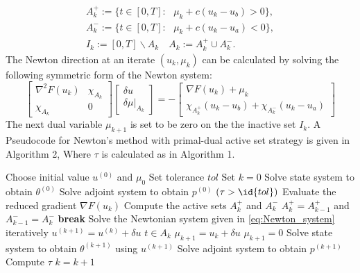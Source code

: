 \begin{align}
    \label{eq:active_inactive}
    A_k^{+} := \{ t \in [0,T]: \text{ } \mu_k + c(u_k - u_b) >0 \}, \\
    A_k^{-} := \{ t \in [0,T]: \text{ } \mu_k + c(u_k - u_a) <0 \}, \\
    I_k := [0,T] \backslash A_k \quad A_k := A_k^{+} \cup A_k^{-}.
\end{align}
The Newton direction at an iterate $(u_k, \mu_k)$ can be calculated by solving the following symmetric form of the Newton system:
\begin{equation}
    \label{eq:Newton_system}
    \begin{bmatrix}
        \nabla^2 F(u_k) & \chi_{A_k} \\
        \chi_{A_k} & 0 
    \end{bmatrix}
    \begin{bmatrix}
    \delta u \\
    \delta \mu|_{A_k}
    \end{bmatrix}
    = - \begin{bmatrix}
    \nabla F(u_k) + \mu_k \\
    \chi_{A_k^{+}}(u_k - u_b) + \chi_{A_k^{-}}(u_k - u_a)
    \end{bmatrix}
\end{equation}
The next dual variable $\mu_{k+1}$ is set to be zero on the the inactive set $I_k$. A Pseudocode for Newton's method with primal-dual active set strategy is given in Algorithm 2, Where $\tau$ is calculated as in Algorithm 1.

\begin{codebox}
\li Choose initial value $u^{(0)}$ and $\mu_0$ 
\li Set tolerance $tol$
\li Set $k = 0$
\li Solve state system to obtain $\theta^{(0)}$
\li Solve adjoint system to obtain $p^{(0)}$
\li \While $(\tau > \id{tol})$ \Then 
\li Evaluate the reduced gradient $\nabla F(u_k)$
\li Compute the active sets $A_k^{+}$ and $A_k^{-}$
\li \If $A_k^{+} = A_{k-1}^{+}$ and $A_{k-1}^{-} = A_k^{-}$ \Then 
\li \textbf{break} \End
\li Solve the Newtonian system given in \eqref{eq:Newton_system} iteratively
\li $u^{(k+1)} = u^{(k)} + \delta u$  
\li \If $t \in A_k$ \Then
    \li $\mu_{k+1} = u_k + \delta u$
    \li \Else $\mu_{k+1} = 0$ 
    \End
\li Solve state system to obtain $\theta^{(k+1)}$ using $u^{(k+1)}$
\li Solve adjoint system to obtain $p^{(k+1)}$ 
\li Compute $\tau$
\li $k = k+1$
\end{codebox}

